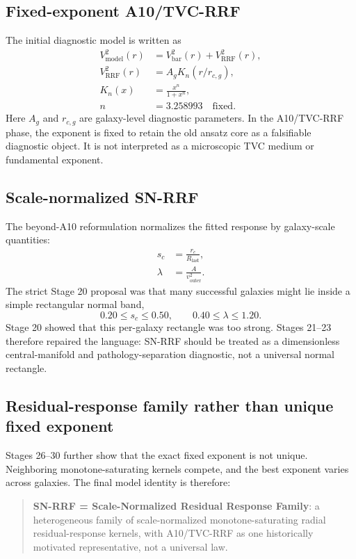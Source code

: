 \documentclass[11pt,a4paper]{article}
\newcommand{\rrf}{\mathrm{RRF}}
\newcommand{\vout}{v_{\mathrm{outer}}}
\newcommand{\rlast}{R_{\mathrm{last}}}
\newcommand{\scc}{s_c}
\newcommand{\lam}{\lambda}
\begin{document}
\subsection{Fixed-exponent A10/TVC-RRF}
The initial diagnostic model is written as
\begin{align}
V^2_{\mathrm{model}}(r) &= V^2_{\mathrm{bar}}(r) + V^2_{\rrf}(r), \\
V^2_{\rrf}(r) &= A_g K_n(r/r_{c,g}), \\
K_n(x) &= \frac{x^n}{1+x^n}, \\
n &= 3.258993 \quad \text{fixed}. 
\end{align}
Here $A_g$ and $r_{c,g}$ are galaxy-level diagnostic parameters. In the A10/TVC-RRF phase, the exponent is fixed to retain the old ansatz core as a falsifiable diagnostic object. It is not interpreted as a microscopic TVC medium or fundamental exponent.

\subsection{Scale-normalized SN-RRF}
The beyond-A10 reformulation normalizes the fitted response by galaxy-scale quantities:
\begin{align}
\scc &= \frac{r_c}{\rlast}, \\
\lam &= \frac{A}{\vout^2}.
\end{align}
The strict Stage 20 proposal was that many successful galaxies might lie inside a simple rectangular normal band,
\begin{equation}
0.20 \leq \scc \leq 0.50, \qquad 0.40 \leq \lam \leq 1.20.
\end{equation}
Stage 20 showed that this per-galaxy rectangle was too strong. Stages 21--23 therefore repaired the language: SN-RRF should be treated as a dimensionless central-manifold and pathology-separation diagnostic, not a universal normal rectangle.

\subsection{Residual-response family rather than unique fixed exponent}
Stages 26--30 further show that the exact fixed exponent is not unique. Neighboring monotone-saturating kernels compete, and the best exponent varies across galaxies. The final model identity is therefore:
\begin{quote}
\textbf{SN-RRF = Scale-Normalized Residual Response Family}: a heterogeneous family of scale-normalized monotone-saturating radial residual-response kernels, with A10/TVC-RRF as one historically motivated representative, not a universal law.
\end{quote}
\end{document}
